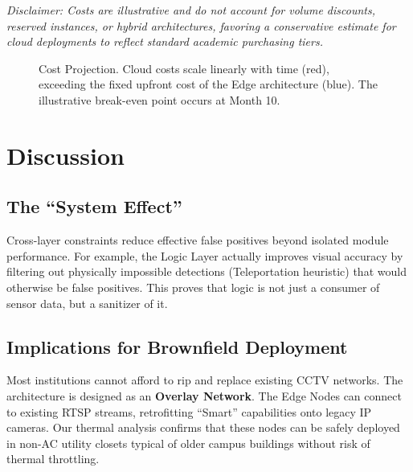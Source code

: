 \documentclass[conference]{IEEEtran}
\begin{document}
\textit{Disclaimer: Costs are illustrative and do not account for volume discounts, reserved instances, or hybrid architectures, favoring a conservative estimate for cloud deployments to reflect standard academic purchasing tiers.}

\begin{figure}[htbp]
\centering
{}
\caption{Cost Projection. Cloud costs scale linearly with time (red), exceeding the fixed upfront cost of the Edge architecture (blue). The illustrative break-even point occurs at Month 10.}
\label{fig:cost}
\end{figure}

\section{Discussion}

\subsection{The ``System Effect''}
Cross-layer constraints reduce effective false positives beyond isolated module performance. For example, the Logic Layer actually improves visual accuracy by filtering out physically impossible detections (Teleportation heuristic) that would otherwise be false positives. This proves that logic is not just a consumer of sensor data, but a sanitizer of it.

\subsection{Implications for Brownfield Deployment}
Most institutions cannot afford to rip and replace existing CCTV networks. The architecture is designed as an \textbf{Overlay Network}. The Edge Nodes can connect to existing RTSP streams, retrofitting ``Smart'' capabilities onto legacy IP cameras. Our thermal analysis confirms that these nodes can be safely deployed in non-AC utility closets typical of older campus buildings without risk of thermal throttling.
\end{document}

